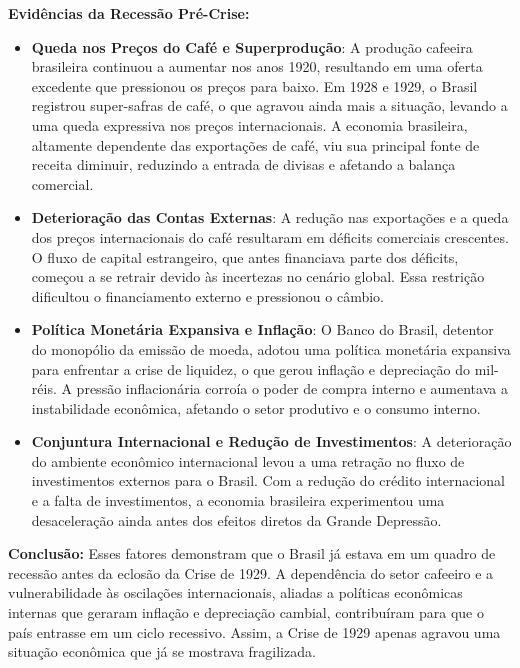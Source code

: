 \documentclass[a4paper,12pt]{article}[abntex2]
\begin{document}
\textbf{Evidências da Recessão Pré-Crise:}
\begin{itemize}
    \item \textbf{Queda nos Preços do Café e Superprodução}: A produção cafeeira brasileira continuou a aumentar nos anos 1920, resultando em uma oferta excedente que pressionou os preços para baixo. Em 1928 e 1929, o Brasil registrou super-safras de café, o que agravou ainda mais a situação, levando a uma queda expressiva nos preços internacionais. A economia brasileira, altamente dependente das exportações de café, viu sua principal fonte de receita diminuir, reduzindo a entrada de divisas e afetando a balança comercial.
    
    \item \textbf{Deterioração das Contas Externas}: A redução nas exportações e a queda dos preços internacionais do café resultaram em déficits comerciais crescentes. O fluxo de capital estrangeiro, que antes financiava parte dos déficits, começou a se retrair devido às incertezas no cenário global. Essa restrição dificultou o financiamento externo e pressionou o câmbio.
    
    \item \textbf{Política Monetária Expansiva e Inflação}: O Banco do Brasil, detentor do monopólio da emissão de moeda, adotou uma política monetária expansiva para enfrentar a crise de liquidez, o que gerou inflação e depreciação do mil-réis. A pressão inflacionária corroía o poder de compra interno e aumentava a instabilidade econômica, afetando o setor produtivo e o consumo interno.
    
    \item \textbf{Conjuntura Internacional e Redução de Investimentos}: A deterioração do ambiente econômico internacional levou a uma retração no fluxo de investimentos externos para o Brasil. Com a redução do crédito internacional e a falta de investimentos, a economia brasileira experimentou uma desaceleração ainda antes dos efeitos diretos da Grande Depressão.
\end{itemize}

\textbf{Conclusão:}
Esses fatores demonstram que o Brasil já estava em um quadro de recessão antes da eclosão da Crise de 1929. A dependência do setor cafeeiro e a vulnerabilidade às oscilações internacionais, aliadas a políticas econômicas internas que geraram inflação e depreciação cambial, contribuíram para que o país entrasse em um ciclo recessivo. Assim, a Crise de 1929 apenas agravou uma situação econômica que já se mostrava fragilizada.
\end{document}
